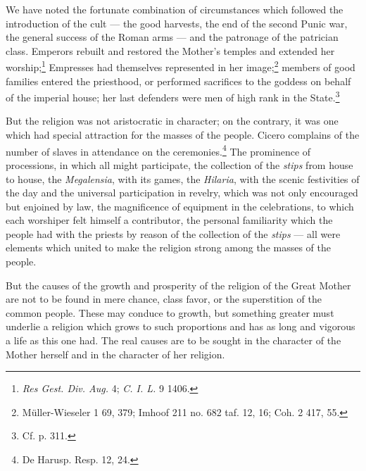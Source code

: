 \documentclass[a4paper, 11pt, oneside, polutonikogreek, french]{article}
\begin{document}
We have noted the fortunate combination of circumstances which followed the introduction of the cult --- the good harvests, the end of the second Punic war, the general success of the Roman arms --- and the patronage of the patrician class. Emperors rebuilt and restored the Mother's temples and extended her worship;\footnote{\emph{Res Gest. Div. Aug.} 4; \emph{C. I. L.} 9 1406.} Empresses had themselves represented in her image;\footnote{Müller-Wieseler 1 69, 379; Imhoof 211 no. 682 taf. 12, 16; Coh. 2 417, 55.} members of good families entered the priesthood, or performed sacrifices to the goddess on behalf of the imperial house; her last defenders were men of high rank in the State.\footnote{Cf. p. 311.}

But the religion was not aristocratic in character; on the contrary, it was one which had special attraction for the masses of the people. Cicero complains of the number of slaves in attendance on the ceremonies.\footnote{De Harusp. Resp. 12, 24.} The prominence of processions, in which all might participate, the collection of the \emph{stips} from house to house, the \emph{Megalensia}, with its games, the \emph{Hilaria}, with the scenic festivities of the day and the universal participation in revelry, which was not only encouraged but enjoined by law, the magnificence of equipment in the celebrations, to which each worshiper felt himself a contributor, the personal familiarity which the people had with the priests by reason of the collection of the \emph{stips} --- all were elements which united to make the religion strong among the masses of the people.

But the causes of the growth and prosperity of the religion of the Great Mother are not to be found in mere chance, class favor, or the superstition of the common people. These may conduce to growth, but something greater must underlie a religion which grows to such proportions and has as long and vigorous a life as this one had. The real causes are to be sought in the character of the Mother herself and in the character of her religion.
\end{document}
